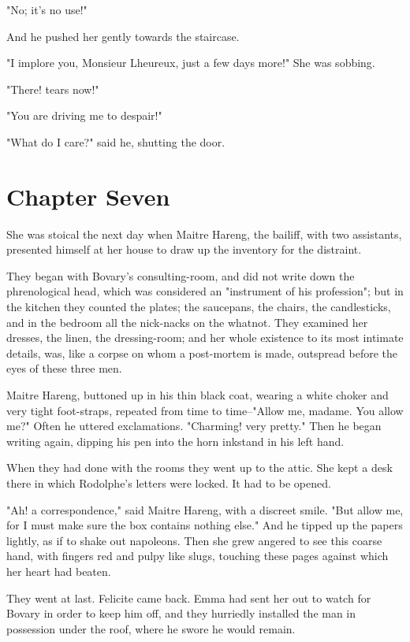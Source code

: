 \documentclass{tufte-book}
\begin{document}
"No; it's no use!"

And he pushed her gently towards the staircase.

"I implore you, Monsieur Lheureux, just a few days more!" She was
sobbing.

"There! tears now!"

"You are driving me to despair!"

"What do I care?" said he, shutting the door.



\chapter{Chapter Seven}

She was stoical the next day when Maitre Hareng, the bailiff, with two
assistants, presented himself at her house to draw up the inventory for
the distraint.

They began with Bovary's consulting-room, and did not write down
the phrenological head, which was considered an "instrument of his
profession"; but in the kitchen they counted the plates; the saucepans,
the chairs, the candlesticks, and in the bedroom all the nick-nacks on
the whatnot. They examined her dresses, the linen, the dressing-room;
and her whole existence to its most intimate details, was, like a corpse
on whom a post-mortem is made, outspread before the eyes of these three
men.

Maitre Hareng, buttoned up in his thin black coat, wearing a white
choker and very tight foot-straps, repeated from time to time--"Allow
me, madame. You allow me?" Often he uttered exclamations. "Charming!
very pretty." Then he began writing again, dipping his pen into the horn
inkstand in his left hand.

When they had done with the rooms they went up to the attic. She kept a
desk there in which Rodolphe's letters were locked. It had to be opened.

"Ah! a correspondence," said Maitre Hareng, with a discreet smile. "But
allow me, for I must make sure the box contains nothing else." And he
tipped up the papers lightly, as if to shake out napoleons. Then she
grew angered to see this coarse hand, with fingers red and pulpy like
slugs, touching these pages against which her heart had beaten.

They went at last. Felicite came back. Emma had sent her out to watch
for Bovary in order to keep him off, and they hurriedly installed the
man in possession under the roof, where he swore he would remain.
\end{document}
